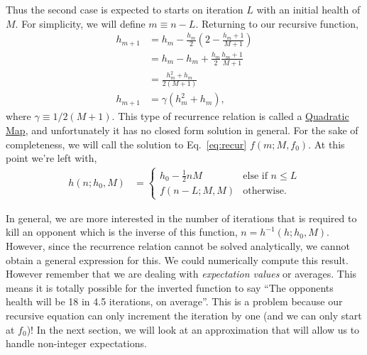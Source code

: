 				Thus the second case is expected to starts on iteration $L$ with an initial health of $M$. For simplicity, we will define $m\equiv n-L$. Returning to our recursive function,
				\begin{align}
					h_{m+1} &= h_{m} - \frac{h_m}{2}\left(2 - \frac{h_m + 1}{M+1}\right) \\
					&= h_{m} - h_m + \frac{h_m}{2}\frac{h_m + 1}{M+1} \\
					&= \frac{h_m^2 + h_m}{2(M+1)} \\
					h_{m+1} &= \gamma (h_m^2 + h_m), \label{eq:recur}
				\end{align}
				where $\gamma\equiv1 / 2(M+1)$. This type of recurrence relation is called a \href{http://mathworld.wolfram.com/QuadraticMap.html}{Quadratic Map}, and unfortunately it has no closed form solution in general. For the sake of completeness, we will call the solution to Eq.~\ref{eq:recur} $f(m; M, f_0)$. At this point we're left with,
				\begin{align}
						h(n; h_0, M) &=  \begin{cases}
						h_0 - \frac{1}{2}nM &\text{else if $n \le L$} \\
						f(n - L; M, M) &\text{otherwise}.
					\end{cases}
				\end{align}

				In general, we are more interested in the number of iterations that is required to kill an opponent which is the inverse of this function, $n=h^{-1}(h; h_0, M)$. However, since the recurrence relation cannot be solved analytically, we cannot obtain a general expression for this. We could numerically compute this result. However remember that we are dealing with \emph{expectation values} or averages. This means it is totally possible for the inverted function to say ``The opponents health will be 18 in 4.5 iterations, on average''. This is a problem because our recursive equation can only increment the iteration by one (and we can only start at $f_0$)! In the next section, we will look at an approximation that will allow us to handle non-integer expectations.

